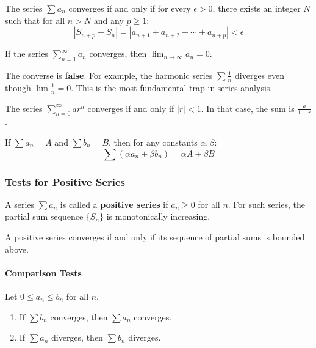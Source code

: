 \begin{theorem}
The series $\sum a_n$ converges if and only if for every $\epsilon > 0$, there exists an integer $N$ such that for all $n > N$ and any $p \ge 1$:
\[ |S_{n+p} - S_n| = |a_{n+1} + a_{n+2} + \cdots + a_{n+p}| < \epsilon \]
\end{theorem}

\begin{theorem}
If the series $\sum_{n=1}^{\infty} a_n$ converges, then $\lim_{n \to \infty} a_n = 0$.
\end{theorem}
\begin{remark}
The converse is \textbf{false}. For example, the harmonic series $\sum \frac{1}{n}$ diverges even though $\lim \frac{1}{n} = 0$. This is the most fundamental trap in series analysis.
\end{remark}

\begin{example}
The series $\sum_{n=0}^{\infty} ar^n$ converges if and only if $|r| < 1$. In that case, the sum is $\frac{a}{1-r}$.
\end{example}

\begin{property}[Linearity]
If $\sum a_n = A$ and $\sum b_n = B$, then for any constants $\alpha, \beta$:
\[ \sum (\alpha a_n + \beta b_n) = \alpha A + \beta B \]
\end{property}

\subsubsection{Tests for Positive Series}

A series $\sum a_n$ is called a \textbf{positive series} if $a_n \ge 0$ for all $n$.
For such series, the partial sum sequence $\{S_n\}$ is monotonically increasing.
\begin{theorem}
A positive series converges if and only if its sequence of partial sums is bounded above.
\end{theorem}

\paragraph{Comparison Tests}
\begin{theorem}
Let $0 \le a_n \le b_n$ for all $n$.
\begin{enumerate}
    \item If $\sum b_n$ converges, then $\sum a_n$ converges.
    \item If $\sum a_n$ diverges, then $\sum b_n$ diverges.
\end{enumerate}
\end{theorem}

